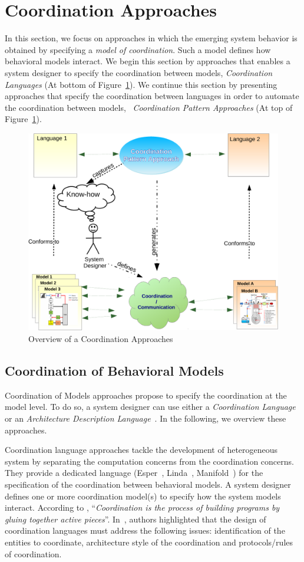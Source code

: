 \section{Coordination Approaches}

In this section, we focus on approaches in which the emerging system behavior is obtained by specifying a \emph{model of coordination}. Such a model defines how behavioral models interact. We begin this section by approaches that enables a system designer to specify the coordination between models, \ie \emph{Coordination Languages} (At bottom of Figure~\ref{fig:coordapp}). We continue this section by presenting approaches that specify the coordination between languages in order to automate the coordination between models, \ie~\emph{Coordination Pattern Approaches} (At top of Figure~\ref{fig:coordapp}).

\begin{figure}
      \begin{center}
         			\includegraphics[width=0.6\columnwidth]{background/figs/coordpatterapp}
         			\caption{Overview of a Coordination Approaches}
         			\label{fig:coordapp}
        \end{center}
\end{figure}


\subsection{Coordination of Behavioral Models}
Coordination of Models approaches propose to specify the coordination at the model level. To do so, a system designer can use either a \emph{Coordination Language}~\cite{coordmodels} or an \emph{Architecture Description Language}~\cite{frameadlsbib}. In the following, we overview these approaches. 
			 
Coordination language approaches tackle the development of heterogeneous system by separating the computation concerns from the coordination concerns. They provide a dedicated language (\eg Esper~\cite{esperbib}, Linda~\cite{lindabib}, Manifold~\cite{manifoldbib}) for the specification of the coordination between behavioral models. A system designer defines one or more coordination model(s) to specify how the system models interact. According to \cite{coordsignibib}, ``\textit{Coordination is the process of building programs by gluing together active pieces}''. In~\cite{wegnercoorbib}, authors highlighted that the design of coordination languages must address the following issues: identification of the entities to coordinate, architecture style of the coordination and protocols/rules of coordination.

